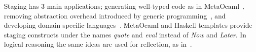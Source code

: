 Staging has $3$ main applications; generating well-typed code as in \mbox{MetaOcaml}~\cite{taha1999multi}, removing abstraction overhead introduced by generic programming~\cite{yallop2016StagingGeneric, carette2011mspFunctorsMonads, carette2011generative}, and developing domain specific languages~\cite{sheard2000stagingDSL}. MetaOcaml and Haskell templates provide staging constructs under the names \emph{quote} and \emph{eval} instead of \emph{Now} and \emph{Later}. In logical reasoning the same ideas are used for reflection, as in~\cite{farmer2013quoteEval}.  



